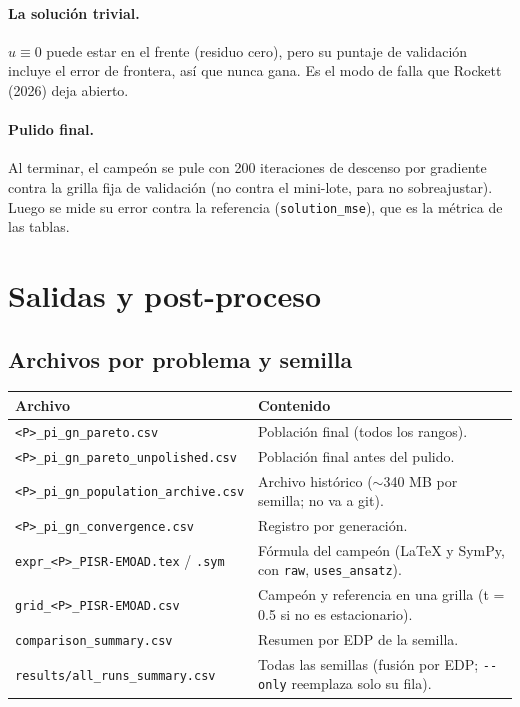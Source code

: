 \documentclass[11pt,a4paper]{article}
\newcommand{\code}[1]{\texttt{\small #1}}
\begin{document}
\paragraph{La solución trivial.} $u\equiv0$ puede estar en el frente (residuo cero), pero su puntaje de
validación incluye el error de frontera, así que nunca gana. Es el modo de falla que Rockett (2026) deja
abierto.

\paragraph{Pulido final.} Al terminar, el campeón se pule con 200 iteraciones de descenso por gradiente
contra la grilla fija de validación (no contra el mini-lote, para no sobreajustar). Luego se mide su
error contra la referencia (\code{solution\_mse}), que es la métrica de las tablas.

\section{Salidas y post-proceso}

\subsection{Archivos por problema y semilla}
\begin{center}\small
\begin{tabular}{@{}p{6cm}p{9cm}@{}}\toprule
Archivo & Contenido\\\midrule
\code{<P>\_pi\_gn\_pareto.csv} & Población final (todos los rangos).\\
\code{<P>\_pi\_gn\_pareto\_unpolished.csv} & Población final antes del pulido.\\
\code{<P>\_pi\_gn\_population\_archive.csv} & Archivo histórico ($\sim$340 MB por semilla; no va a git).\\
\code{<P>\_pi\_gn\_convergence.csv} & Registro por generación.\\
\code{expr\_<P>\_PISR-EMOAD.tex} / \code{.sym} & Fórmula del campeón (LaTeX y SymPy, con \code{raw}, \code{uses\_ansatz}).\\
\code{grid\_<P>\_PISR-EMOAD.csv} & Campeón y referencia en una grilla (t = 0.5 si no es estacionario).\\
\code{comparison\_summary.csv} & Resumen por EDP de la semilla.\\
\code{results/all\_runs\_summary.csv} & Todas las semillas (fusión por EDP; \code{-{}-only} reemplaza solo su fila).\\\bottomrule
\end{tabular}\end{center}
\end{document}
